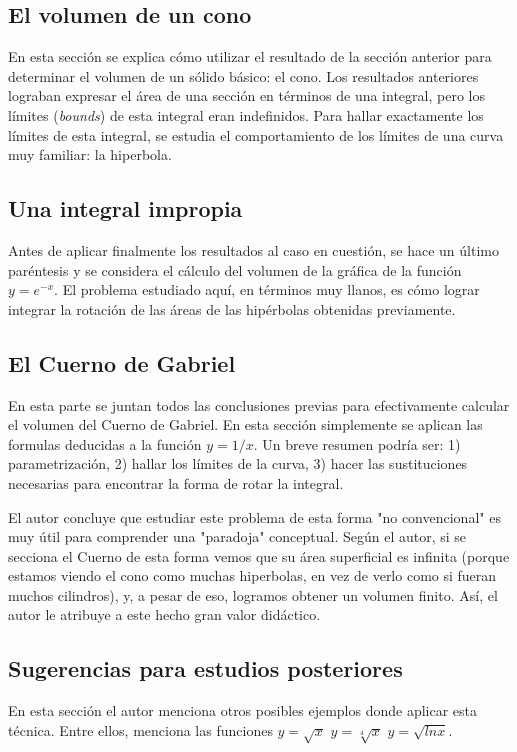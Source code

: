 \documentclass[11pt]{article}
\begin{document}
\subsection{El volumen de un cono}
\label{sec-4-2}
En esta sección se explica cómo utilizar el resultado de la sección anterior para determinar el volumen
de un sólido básico: el cono. Los resultados anteriores lograban expresar el área de una sección 
en términos de una integral, pero los límites (\emph{bounds}) de esta integral eran indefinidos. Para hallar 
exactamente los límites de esta integral, se estudia el comportamiento de los límites de una curva muy
familiar: la hiperbola. 

\subsection{Una integral impropia}
\label{sec-4-3}
Antes de aplicar finalmente los resultados al caso en cuestión, se hace un último paréntesis
y se considera el cálculo del volumen de la gráfica de la función \(y= e^{-x}\). El problema estudiado aquí, 
en términos muy llanos, es cómo lograr integrar la rotación de las áreas de las hipérbolas obtenidas previamente. 

\subsection{El Cuerno de Gabriel}
\label{sec-4-4}
En esta parte se juntan todos las conclusiones previas para efectivamente calcular 
el volumen del Cuerno de Gabriel. En esta sección simplemente se aplican las formulas deducidas
a la función  \(y= 1/x\). Un breve resumen podría ser: 1) parametrización, 2)  hallar 
los límites de la curva, 3) hacer las sustituciones necesarias para encontrar la forma de 
rotar la integral. 

El autor concluye que estudiar este problema de esta forma "no convencional" es muy útil
para comprender una "paradoja" conceptual. Según el autor, si se secciona el Cuerno de esta forma
vemos que su área superficial es infinita (porque estamos viendo el cono como muchas hiperbolas, en vez 
de verlo como si fueran muchos cilindros), y, a pesar de eso, logramos obtener un volumen finito. 
Así, el autor le atribuye a este hecho gran valor didáctico. 

\subsection{Sugerencias para estudios posteriores}
\label{sec-4-5}
En esta sección el autor menciona otros posibles ejemplos donde aplicar 
esta técnica. Entre ellos, menciona las funciones \(y= \sqrt{x}\)  \(y= \sqrt[4]{x}\)  \(y = \sqrt{ln x}\).


\end{document}
